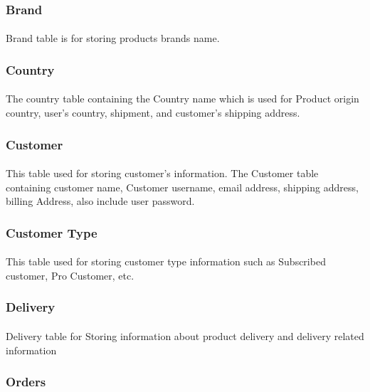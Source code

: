\documentclass{article}
\begin{document}
	\subsubsection{Brand}
	\paragraph{}
	Brand table is for storing products brands name.
	\subsubsection{Country}
	\paragraph{}
	The country table containing the Country name which is used for Product origin country, user's country, shipment, and customer's shipping address.
	\subsubsection{Customer}
	\paragraph{}
	This table used for storing customer's information. The Customer table containing customer name, Customer username, email address, shipping address, billing Address, also include user password.
	\subsubsection{Customer Type}
	\paragraph{}
	This table used for storing customer type information such as
	Subscribed customer, Pro Customer, etc.
	
	\subsubsection{Delivery}
	\paragraph{}
	Delivery table for Storing information about product delivery and delivery related information
	\subsubsection{Orders}
\end{document}
